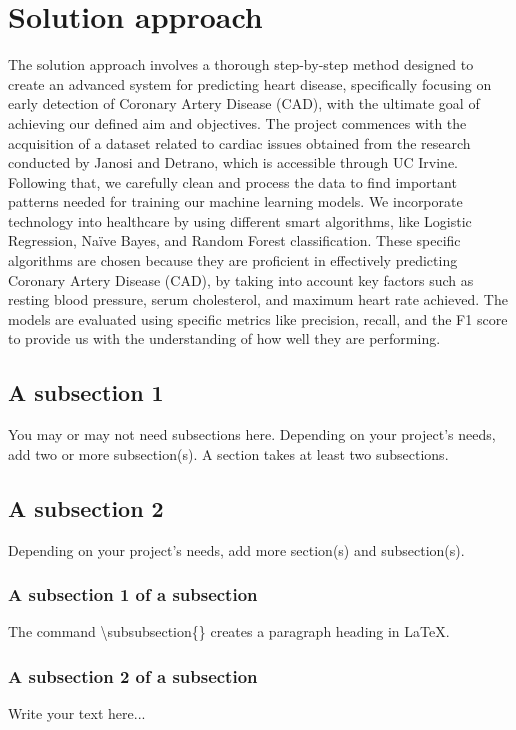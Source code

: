 \section{Solution approach}
\label{sec:intro_sol} %
The solution approach involves a thorough step-by-step method designed to create an advanced system for predicting heart disease, specifically focusing on early detection of Coronary Artery Disease (CAD), with the ultimate goal of achieving our defined aim and objectives. The project commences with the acquisition of a dataset related to cardiac issues obtained from the research conducted by Janosi and Detrano, which is accessible through UC Irvine. Following that, we carefully clean and process the data to find important patterns needed for training our machine learning models. We incorporate technology into healthcare by using different smart algorithms, like Logistic Regression, Naïve Bayes, and Random Forest classification. These specific algorithms are chosen because they are proficient in effectively predicting Coronary Artery Disease (CAD), by taking into account key factors such as resting blood pressure, serum cholesterol, and maximum heart rate achieved. The models are evaluated using specific metrics like precision, recall, and the F1 score to provide us with the understanding of how well they are performing.


\subsection{A subsection 1}
\label{sec:intro_some_sub1}
You may or may not need subsections here. Depending on your project's needs, add two or more subsection(s). A section takes at least two subsections. 

\subsection{A subsection 2}
\label{sec:intro_some_sub2}
Depending on your project's needs, add more section(s) and subsection(s).

\subsubsection{A subsection 1 of a subsection}
\label{sec:intro_some_subsub1}
The command \textbackslash subsubsection\{\} creates a paragraph heading in \LaTeX.

\subsubsection{A subsection 2 of a subsection}
\label{sec:intro_some_subsub2}
Write your text here...

